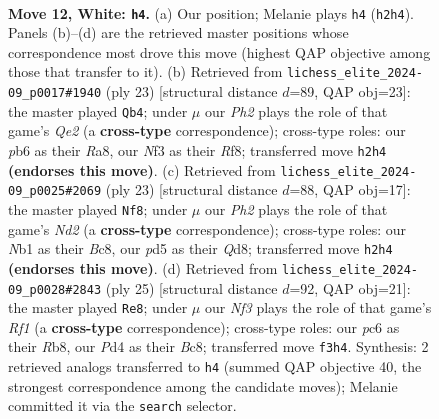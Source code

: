 \documentclass[11pt]{article}
\begin{document}
\clearpage

\begin{figure}[p]\centering
\begin{subfigure}{0.46\textwidth}\centering
\resizebox{\linewidth}{!}{%
\newchessgame
\chessboard[
  setfen={rnb2rk1/p3b1pp/1ppq1n2/3p1p2/3P4/1P2PNP1/P3QPBP/RNB1R1K1 w - - 2 12},
  showmover=false,
  pgfstyle=straightmove, color=movearrow, markmove={h2-h4}
]}
\caption{}
\end{subfigure}\hfill
\begin{subfigure}{0.46\textwidth}\centering
\resizebox{\linewidth}{!}{%
\newchessgame
\chessboard[
  setfen={r1b2rk1/1p2qpbp/2n1pnp1/pN1p4/P2P1B2/1Q3NP1/1P2PPBP/R4RK1 b - - 3 12},
  showmover=false,
  pgfstyle=straightmove, color=movearrow, markmove={e7-b4}
]}
\caption{}
\end{subfigure}
\\[4pt]
\begin{subfigure}{0.46\textwidth}\centering
\resizebox{\linewidth}{!}{%
\newchessgame
\chessboard[
  setfen={r1bqr1k1/p2n1pbp/1pp3p1/2p1p3/4P3/2PPBN1P/PPQN1PP1/R2R2K1 b - - 5 12},
  showmover=false,
  pgfstyle=straightmove, color=movearrow, markmove={d7-f8}
]}
\caption{}
\end{subfigure}\hfill
\begin{subfigure}{0.46\textwidth}\centering
\resizebox{\linewidth}{!}{%
\newchessgame
\chessboard[
  setfen={1rbq1rk1/1p2ppbp/p2p1np1/2pP4/P1P5/R1NQ1NPP/1P2PPB1/2R3K1 b - - 0 13},
  showmover=false,
  pgfstyle=straightmove, color=movearrow, markmove={f8-e8}
]}
\caption{}
\end{subfigure}
\caption{\textbf{Move 12, White: \texttt{h4}.} (a) Our position; Melanie plays \texttt{h4} (\texttt{h2h4}). Panels (b)--(d) are the retrieved master positions whose correspondence most drove this move (highest QAP objective among those that transfer to it). (b) Retrieved from \texttt{lichess\_elite\_2024-09\_p0017\#1940} (ply 23) [structural distance $d$=89, QAP obj=23]: the master played \texttt{Qb4}; under $\mu$ our \emph{Ph2} plays the role of that game's \emph{Qe2} (a \textbf{cross-type} correspondence); cross-type roles: our \emph{p}b6 as their \emph{R}a8, our \emph{N}f3 as their \emph{R}f8; transferred move \texttt{h2h4} \textbf{(endorses this move)}. (c) Retrieved from \texttt{lichess\_elite\_2024-09\_p0025\#2069} (ply 23) [structural distance $d$=88, QAP obj=17]: the master played \texttt{Nf8}; under $\mu$ our \emph{Ph2} plays the role of that game's \emph{Nd2} (a \textbf{cross-type} correspondence); cross-type roles: our \emph{N}b1 as their \emph{B}c8, our \emph{p}d5 as their \emph{Q}d8; transferred move \texttt{h2h4} \textbf{(endorses this move)}. (d) Retrieved from \texttt{lichess\_elite\_2024-09\_p0028\#2843} (ply 25) [structural distance $d$=92, QAP obj=21]: the master played \texttt{Re8}; under $\mu$ our \emph{Nf3} plays the role of that game's \emph{Rf1} (a \textbf{cross-type} correspondence); cross-type roles: our \emph{p}c6 as their \emph{R}b8, our \emph{P}d4 as their \emph{B}c8; transferred move \texttt{f3h4}. Synthesis: 2 retrieved analogs transferred to \texttt{h4} (summed QAP objective 40, the strongest correspondence among the candidate moves); Melanie committed it via the \texttt{search} selector.}

\end{figure}
\end{document}
